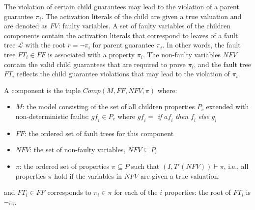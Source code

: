 The violation of certain child guarantees may lead to the violation of a parent guarantee $\pi_i$. The activation literals of the child are given a true valuation and are denoted as $\mathit{FV}$: faulty variables. A set of faulty variables of the children components contain the activation literals that correspond to leaves of a fault tree $\mathcal{L}$ with the root $r = \neg \pi_i$ for parent guarantee $\pi_i$. In other words, the fault tree $\mathit{FT_i} \in \mathit{FF}$ is associated with a property $\pi_i$. The non-faulty variables $\mathit{NFV}$ contain the valid child guarantees that are required to prove $\pi_i$, and the fault tree $\mathit{FT_i}$ reflects the child guarantee violations that may lead to the violation of $\pi_i$.


\begin{definition}
A component is the tuple $\mathit{Comp}(M, \mathit{FF}, \mathit{NFV}, \pi)$ where:
\begin{itemize}[label=\textbullet]
\item $M$: the model consisting of the set of all children properties $P_c$ extended with non-deterministic faults: $\mathit{gf_i} \in P_c$ where $\mathit{gf_i} =$ \textit{if} $\mathit{af_i}$ \textit{then} $\mathit{f}_i$ \textit{else} $g_i$
\item $\mathit{FF}$: the ordered set of fault trees for this component
\item $\mathit{NFV}$: the set of non-faulty variables, $\mathit{NFV} \subseteq P_c$
\item $\pi$: the ordered set of properties $\pi \subseteq P$ such that $(I, T'(\mathit{NFV})) \vdash \pi$, i.e., all properties $\pi$ hold if the variables in $\mathit{NFV}$ are given a true valuation.
\end{itemize}
and $\mathit{FT}_i \in \mathit{FF}$ corresponds to $\pi_i \in \pi$ for each of the $i$ properties: the root of $\mathit{FT_i}$ is $\neg \pi_i$. 
\end{definition}


